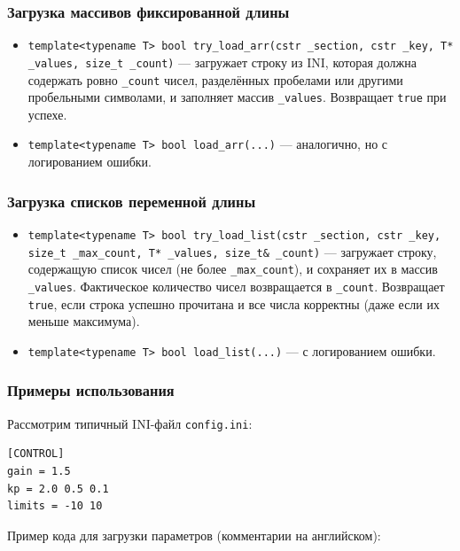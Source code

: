 \documentclass[a4paper,12pt]{article}
\begin{document}
\subsubsection{Загрузка массивов фиксированной длины}

\begin{itemize}
    \item \texttt{template<typename T> bool try\_load\_arr(cstr \_section, cstr \_key, T* \_values, size\_t \_count)} — загружает строку из INI, которая должна содержать ровно \texttt{\_count} чисел, разделённых пробелами или другими пробельными символами, и заполняет массив \texttt{\_values}. Возвращает \texttt{true} при успехе.
    
    \item \texttt{template<typename T> bool load\_arr(...)} — аналогично, но с логированием ошибки.
\end{itemize}

\subsubsection{Загрузка списков переменной длины}

\begin{itemize}
    \item \texttt{template<typename T> bool try\_load\_list(cstr \_section, cstr \_key, size\_t \_max\_count, T* \_values, size\_t\& \_count)} — загружает строку, содержащую список чисел (не более \texttt{\_max\_count}), и сохраняет их в массив \texttt{\_values}. Фактическое количество чисел возвращается в \texttt{\_count}. Возвращает \texttt{true}, если строка успешно прочитана и все числа корректны (даже если их меньше максимума).
    
    \item \texttt{template<typename T> bool load\_list(...)} — с логированием ошибки.
\end{itemize}

\subsubsection{Примеры использования}

Рассмотрим типичный INI-файл \texttt{config.ini}:

\begin{lstlisting}
[CONTROL]
gain = 1.5
kp = 2.0 0.5 0.1
limits = -10 10
\end{lstlisting}

Пример кода для загрузки параметров (комментарии на английском):
\end{document}
